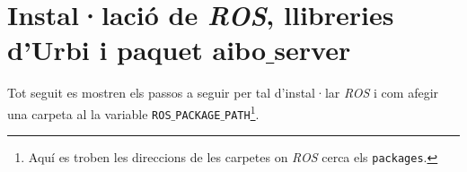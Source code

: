 \documentclass[12pt,a4paper,final,twoside]{article}
\begin{document}
\newpage




\label{Referencies}


\appendix
\clearpage %
\addappheadtotoc
\appendixpage

\section{Instal·lació de \textit{ROS}, llibreries d'Urbi i paquet aibo$\_$server}

Tot seguit es mostren els passos a seguir per tal d'instal·lar \textit{ROS} i com afegir una carpeta al la variable \texttt{ROS$\_$PACKAGE$\_$PATH}\footnote{Aquí es troben les direccions de les carpetes on \textit{ROS} cerca els \texttt{packages}.}.
\end{document}
